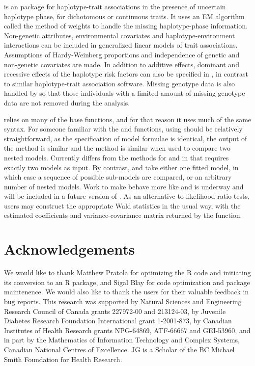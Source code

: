 \documentclass[article, shortnames]{jss}
\begin{document}
 is an  package for haplotype-trait associations
in the presence of uncertain haplotype phase, for dichotomous or
continuous traits. It uses an EM algorithm called the method of weights to
handle the missing haplotype-phase information. Non-genetic attributes, 
environmental covariates and haplotype-environment interactions can be 
included in generalized linear models of trait associations. Assumptions 
of Hardy-Weinberg proportions and independence of genetic and non-genetic 
covariates are made.  In addition to additive effects, dominant and recessive 
effects of the haplotype risk factors can also be specified in , 
in contrast to similar haplotype-trait association software. 
Missing genotype data
is also handled by  so that those 
individuals with a limited amount 
of missing genotype data are not removed during the analysis. 

 relies on many of the  base functions, and for that
reason it uses much of the same syntax. For someone familiar with the
  and  functions, using 
should be relatively straightforward, as the specification of 
model formulae is 
identical, the output of the  method is 
similar and the  method is similar
when used to compare two nested models. 
Currently  differs from the  methods
for  and  in that  requires
exactly two models as input. By contrast,  and 
 take either one fitted model, in which case a 
sequence of possible sub-models are compared, or 
an arbitrary number of nested models.
Work to make  behave more like 
and  is underway and will
be included in a future version of . 
As an alternative to likelihood ratio tests, users may construct the
appropriate Wald statistics in the usual way, with the 
estimated coefficients and variance-covariance matrix returned by the 
 function.


\section*{Acknowledgements}

We would like to thank Matthew Pratola for optimizing the R code and 
initiating its conversion to an R package, and Sigal Blay for 
code optimization and package maintenence. We would also like to
thank the  users for their valuable feedback 
in bug reports. This research was supported
by Natural Sciences and Engineering Research Council of Canada grants
227972-00 and 213124-03,
by Juvenile Diabetes Research Foundation International grant 1-2001-873,
by Canadian Institutes of Health Research grants 
NPG-64869, ATF-66667 and GEI-53960, and in part by
the Mathematics of Information Technology and Complex Systems,
Canadian National Centres of Excellence.
JG is a Scholar of the BC Michael Smith Foundation for Health Research.
\end{document}
